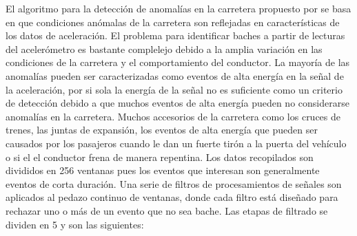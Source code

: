 
El algoritmo para la detección de anomalías en la carretera propuesto por \cite{eriksson2008pothole} se basa en que condiciones anómalas de la carretera
son reflejadas en características de los datos de aceleración. El problema para identificar baches a partir de lecturas del acelerómetro es bastante
complelejo debido a la amplia variación en las condiciones de la carretera y el comportamiento del conductor. La mayoría de las anomalías pueden ser
caracterizadas como eventos de alta energía en la señal de la aceleración, por si sola la energía de la señal no es suficiente como un criterio de
detección debido a que muchos eventos de alta energía pueden no considerarse anomalías en la carretera. Muchos accesorios de la carretera como
los cruces de trenes, las juntas de expansión, los eventos de alta energía que pueden ser causados por los pasajeros cuando le dan un fuerte
tirón a la puerta del vehículo o si el el conductor frena de manera repentina. Los datos recopilados son divididos en 256 ventanas pues
los eventos que interesan son generalmente eventos de corta duración. Una serie de filtros de procesamientos de señales son aplicados
al  pedazo continuo de ventanas, donde cada filtro está diseñado para rechazar uno o más de un evento que no sea bache.
Las etapas de filtrado se dividen en 5 y son las siguientes:

